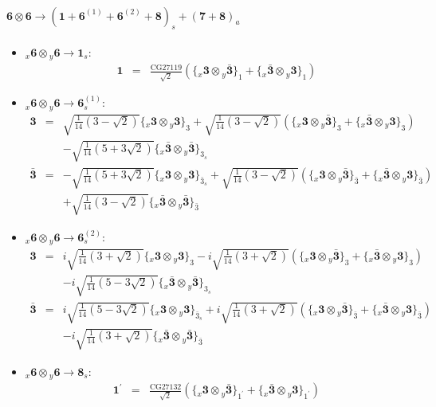 \documentclass[english]{article}
\newcommand{\rep}[1]{\mathbf{#1}}
\newcommand{\repx}[2]{{}_{#2}\mathbf{#1}}
\newcommand{\subcg}[3]{\big\{ \repx{#1}{x}\otimes\repx{#2}{y}\big\}^{}_{#3}}
\begin{document}
\paragraph*{\Large $\rep{6}\otimes\rep{6}\to\left(\rep{1}+\rep{6}^{(1)}+\rep{6}^{(2)}+\rep{8}\right)_s+\left(\rep{7}+\rep{8}\right)_a$}
\begin{itemize}
\item $\repx{6}{x}\otimes\repx{6}{y}\to\rep{1}_{s}$:
\begin{eqnarray*}
\rep{1} &=& \frac{\text{CG27119}}{\sqrt{2}}\left(\subcg{3}{\bar{3}}{1}+\subcg{\bar{3}}{3}{1}\right)
\end{eqnarray*}
\item $\repx{6}{x}\otimes\repx{6}{y}\to\rep{6}_{s}^{(1)}$:
\begin{eqnarray*}
\rep{3} &=& \sqrt{\frac{1}{14} \left(3-\sqrt{2}\right)}\subcg{3}{3}{3}+\sqrt{\frac{1}{14} \left(3-\sqrt{2}\right)}\left(\subcg{3}{\bar{3}}{3}+\subcg{\bar{3}}{3}{3}\right) \\ 
 & & -\sqrt{\frac{1}{14} \left(5+3 \sqrt{2}\right)}\subcg{\bar{3}}{\bar{3}}{3_{s}}
\\
\rep{\bar{3}} &=& -\sqrt{\frac{1}{14} \left(5+3 \sqrt{2}\right)}\subcg{3}{3}{\bar{3}_{s}}+\sqrt{\frac{1}{14} \left(3-\sqrt{2}\right)}\left(\subcg{3}{\bar{3}}{\bar{3}}+\subcg{\bar{3}}{3}{\bar{3}}\right) \\ 
 & & +\sqrt{\frac{1}{14} \left(3-\sqrt{2}\right)}\subcg{\bar{3}}{\bar{3}}{\bar{3}}
\end{eqnarray*}
\item $\repx{6}{x}\otimes\repx{6}{y}\to\rep{6}_{s}^{(2)}$:
\begin{eqnarray*}
\rep{3} &=& i \sqrt{\frac{1}{14} \left(3+\sqrt{2}\right)}\subcg{3}{3}{3}-i \sqrt{\frac{1}{14} \left(3+\sqrt{2}\right)}\left(\subcg{3}{\bar{3}}{3}+\subcg{\bar{3}}{3}{3}\right) \\ 
 & & -i \sqrt{\frac{1}{14} \left(5-3 \sqrt{2}\right)}\subcg{\bar{3}}{\bar{3}}{3_{s}}
\\
\rep{\bar{3}} &=& i \sqrt{\frac{1}{14} \left(5-3 \sqrt{2}\right)}\subcg{3}{3}{\bar{3}_{s}}+i \sqrt{\frac{1}{14} \left(3+\sqrt{2}\right)}\left(\subcg{3}{\bar{3}}{\bar{3}}+\subcg{\bar{3}}{3}{\bar{3}}\right) \\ 
 & & -i \sqrt{\frac{1}{14} \left(3+\sqrt{2}\right)}\subcg{\bar{3}}{\bar{3}}{\bar{3}}
\end{eqnarray*}
\item $\repx{6}{x}\otimes\repx{6}{y}\to\rep{8}_{s}$:
\begin{eqnarray*}
\rep{1^{\prime}} &=& \frac{\text{CG27132}}{\sqrt{2}}\left(\subcg{3}{\bar{3}}{1^{\prime}}+\subcg{\bar{3}}{3}{1^{\prime}}\right)

\end{eqnarray*}
\end{itemize}
\end{document}
